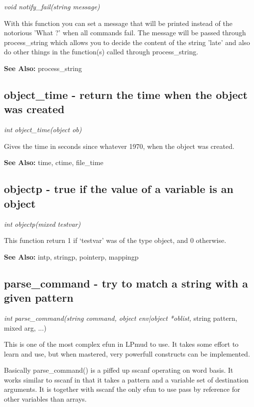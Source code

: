     {\em void notify\_fail(string message)}

    With this function you can set a message that will be printed instead
    of the notorious 'What ?' when all commands fail. The message will be
    passed through process\_string which allows you to decide the
    content of the string 'late' and also do other things in the
    function(s) called through process\_string.

    {\bf See Also: }    process\_string     


\subsection{object\_time - return the time when the object was created}

    {\em int object\_time(object ob)}

    Gives the time in seconds since whatever 1970, when the object
    was created.
    
    {\bf See Also: }    time, ctime, file\_time



\subsection{objectp - true if the value of a variable is an object}

    {\em int objectp(mixed testvar)}

    This function return 1 if `testvar' was of the type object,
    and 0 otherwise.

    {\bf See Also: }    intp, stringp, pointerp, mappingp



\subsection{parse\_command - try to match a string with a given pattern}

    {\em int parse\_command(string command, object env|object *oblist,}
              string pattern, mixed arg, ...)

  This is one of the most complex efun in LPmud to use. It takes
  some effort to learn and use, but when mastered, very powerfull constructs
  can be implemented.

  Basically parse\_command() is a piffed up sscanf operating on word basis. It
  works similar to sscanf in that it takes a pattern and a variable set of
  destination arguments. It is together with sscanf the only efun to use
  pass by reference for other variables than arrays.

